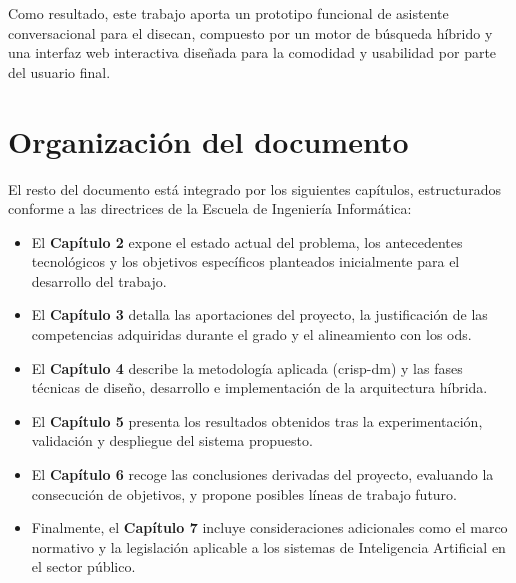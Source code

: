 Como resultado, este trabajo aporta un prototipo funcional de asistente conversacional para el \gls{disecan}, compuesto por un motor de búsqueda híbrido y una interfaz web interactiva diseñada para la comodidad y usabilidad por parte del usuario final.

\section{Organización del documento}
El resto del documento está integrado por los siguientes capítulos, estructurados conforme a las directrices de la Escuela de Ingeniería Informática:

\begin{itemize}
    \item El \textbf{Capítulo 2} expone el estado actual del problema, los antecedentes tecnológicos y los objetivos específicos planteados inicialmente para el desarrollo del trabajo.
    \item El \textbf{Capítulo 3} detalla las aportaciones del proyecto, la justificación de las competencias adquiridas durante el grado y el alineamiento con los \gls{ods}.
    \item El \textbf{Capítulo 4} describe la metodología aplicada (\gls{crisp-dm}) y las fases técnicas de diseño, desarrollo e implementación de la arquitectura híbrida.
    \item El \textbf{Capítulo 5} presenta los resultados obtenidos tras la experimentación, validación y despliegue del sistema propuesto.
    \item El \textbf{Capítulo 6} recoge las conclusiones derivadas del proyecto, evaluando la consecución de objetivos, y propone posibles líneas de trabajo futuro.
    \item Finalmente, el \textbf{Capítulo 7} incluye consideraciones adicionales como el marco normativo y la legislación aplicable a los sistemas de Inteligencia Artificial en el sector público.
\end{itemize}